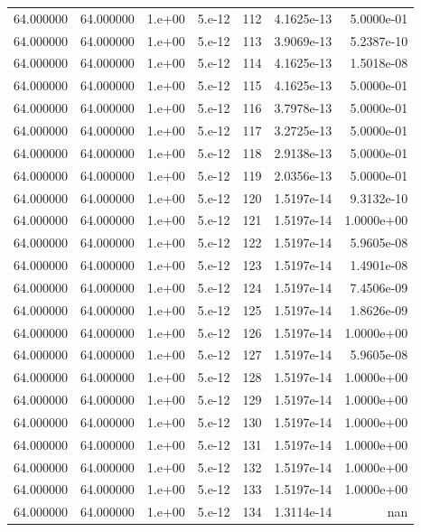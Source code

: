 \begin{table}[htbp]
\begin{tabular}{rrrrrrr}
64.000000 & 64.000000 & 1.e+00 & 5.e-12 & 112 & 4.1625e-13 & 5.0000e-01 \\
64.000000 & 64.000000 & 1.e+00 & 5.e-12 & 113 & 3.9069e-13 & 5.2387e-10 \\
64.000000 & 64.000000 & 1.e+00 & 5.e-12 & 114 & 4.1625e-13 & 1.5018e-08 \\
64.000000 & 64.000000 & 1.e+00 & 5.e-12 & 115 & 4.1625e-13 & 5.0000e-01 \\
64.000000 & 64.000000 & 1.e+00 & 5.e-12 & 116 & 3.7978e-13 & 5.0000e-01 \\
64.000000 & 64.000000 & 1.e+00 & 5.e-12 & 117 & 3.2725e-13 & 5.0000e-01 \\
64.000000 & 64.000000 & 1.e+00 & 5.e-12 & 118 & 2.9138e-13 & 5.0000e-01 \\
64.000000 & 64.000000 & 1.e+00 & 5.e-12 & 119 & 2.0356e-13 & 5.0000e-01 \\
64.000000 & 64.000000 & 1.e+00 & 5.e-12 & 120 & 1.5197e-14 & 9.3132e-10 \\
64.000000 & 64.000000 & 1.e+00 & 5.e-12 & 121 & 1.5197e-14 & 1.0000e+00 \\
64.000000 & 64.000000 & 1.e+00 & 5.e-12 & 122 & 1.5197e-14 & 5.9605e-08 \\
64.000000 & 64.000000 & 1.e+00 & 5.e-12 & 123 & 1.5197e-14 & 1.4901e-08 \\
64.000000 & 64.000000 & 1.e+00 & 5.e-12 & 124 & 1.5197e-14 & 7.4506e-09 \\
64.000000 & 64.000000 & 1.e+00 & 5.e-12 & 125 & 1.5197e-14 & 1.8626e-09 \\
64.000000 & 64.000000 & 1.e+00 & 5.e-12 & 126 & 1.5197e-14 & 1.0000e+00 \\
64.000000 & 64.000000 & 1.e+00 & 5.e-12 & 127 & 1.5197e-14 & 5.9605e-08 \\
64.000000 & 64.000000 & 1.e+00 & 5.e-12 & 128 & 1.5197e-14 & 1.0000e+00 \\
64.000000 & 64.000000 & 1.e+00 & 5.e-12 & 129 & 1.5197e-14 & 1.0000e+00 \\
64.000000 & 64.000000 & 1.e+00 & 5.e-12 & 130 & 1.5197e-14 & 1.0000e+00 \\
64.000000 & 64.000000 & 1.e+00 & 5.e-12 & 131 & 1.5197e-14 & 1.0000e+00 \\
64.000000 & 64.000000 & 1.e+00 & 5.e-12 & 132 & 1.5197e-14 & 1.0000e+00 \\
64.000000 & 64.000000 & 1.e+00 & 5.e-12 & 133 & 1.5197e-14 & 1.0000e+00 \\
64.000000 & 64.000000 & 1.e+00 & 5.e-12 & 134 & 1.3114e-14 & nan \\

\end{tabular}
\end{table}
